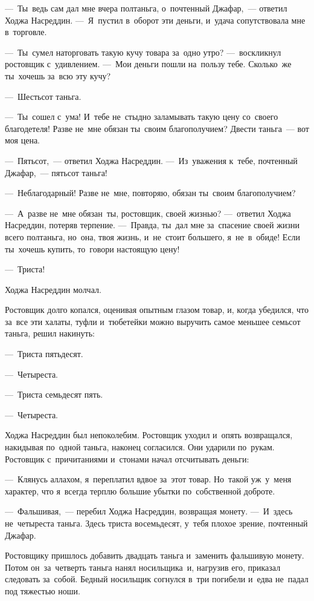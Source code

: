 \documentclass[12pt,a4paper]{book}
\begin{document}
—~Ты~ведь сам дал мне вчера полтаньга, о~почтенный Джафар,~— ответил Ходжа Насреддин. —~Я~пустил в~оборот эти деньги, и~удача сопутствовала мне в~торговле.

—~Ты~сумел наторговать такую кучу товара за~одно утро? —~воскликнул ростовщик с~удивлением. —~Мои деньги пошли на~пользу тебе. Сколько~же ты~хочешь за~всю эту кучу?

—~Шестьсот таньга.

—~Ты~сошел с~ума! И~тебе не~стыдно заламывать такую цену со~своего благодетеля! Разве не~мне обязан ты~своим благополучием? Двести таньга~— вот моя цена.

—~Пятьсот,~— ответил Ходжа Насреддин. —~Из~уважения к~тебе, почтенный Джафар,~— пятьсот таньга!

—~Неблагодарный! Разве не~мне, повторяю, обязан ты~своим благополучием?

—~А~разве не~мне обязан~ты, ростовщик, своей жизнью? —~ответил Ходжа Насреддин, потеряв терпение. —~Правда, ты~дал мне за~спасение своей жизни всего полтаньга, но~она, твоя жизнь, и~не~стоит большего, я~не~в~обиде! Если ты~хочешь купить, то~говори настоящую цену!

—~Триста!

Ходжа Насреддин молчал.

Ростовщик долго копался, оценивая опытным глазом товар, и, когда убедился, что за~все эти халаты, туфли и~тюбетейки можно выручить самое меньшее семьсот таньга, решил накинуть:

—~Триста пятьдесят.

—~Четыреста.

—~Триста семьдесят пять.

—~Четыреста.

Ходжа Насреддин был непоколебим. Ростовщик уходил и~опять возвращался, накидывая по~одной таньга, наконец согласился. Они ударили по~рукам. Ростовщик с~причитаниями и~стонами начал отсчитывать деньги:

—~Клянусь аллахом, я~переплатил вдвое за~этот товар. Но~такой уж~у~меня характер, что я~всегда терплю большие убытки по~собственной доброте.

—~Фальшивая,~— перебил Ходжа Насреддин, возвращая монету. —~И~здесь не~четыреста таньга. Здесь триста восемьдесят, у~тебя плохое зрение, почтенный Джафар.

Ростовщику пришлось добавить двадцать таньга и~заменить фальшивую монету. Потом он~за~четверть таньга нанял носильщика~и, нагрузив его, приказал следовать за~собой. Бедный носильщик согнулся в~три погибели и~едва не~падал под тяжестью ноши.
\end{document}
